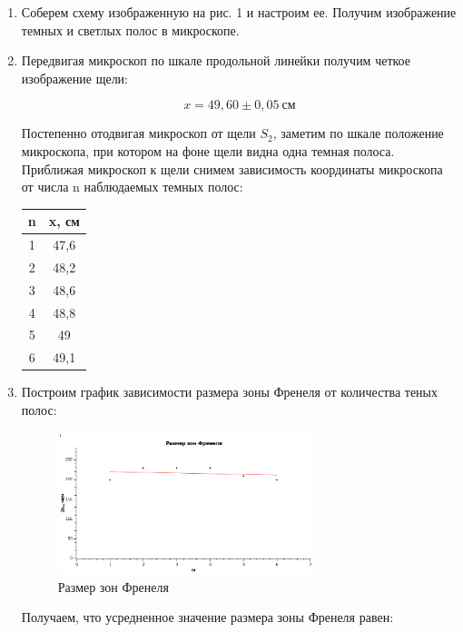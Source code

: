 \documentclass[a4paper, 12pt]{article}%
\begin{document}
\begin{enumerate}

\item Соберем схему изображенную на рис. 1 и настроим ее. Получим изображение темных и светлых полос в микроскопе.

\item Передвигая микроскоп по шкале продольной линейки получим четкое изображение щели:

\[x = 49,60 \pm 0,05 \: \text{см}\]

Постепенно отодвигая микроскоп от щели $S_2$, заметим по шкале положение микроскопа, при котором на фоне щели видна одна темная полоса. Приближая микроскоп к щели снимем зависимость координаты микроскопа от числа n наблюдаемых темных полос:

\begin{center}
\begin{tabular}{|c|c|}
\hline 
n & x, см \\ 
\hline 
1 & 47,6 \\ 
\hline 
2 & 48,2 \\ 
\hline 
3 & 48,6 \\ 
\hline 
4 & 48,8 \\ 
\hline 
5 & 49 \\ 
\hline 
6 & 49,1 \\ 
\hline 
\end{tabular} 
\end{center} 

\item Построим график зависимости размера зоны Френеля от количества теных полос:

\begin{figure}[h]
		\begin{center}
			\includegraphics[width = 0.7\textwidth]{images/graph_!.png}
			\caption{Размер зон Френеля}
		\end{center}
	\end{figure}
	
Получаем, что усредненное значение размера зоны Френеля равен:


\end{enumerate}
\end{document}
